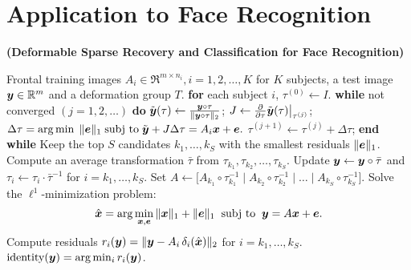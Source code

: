 \documentclass[10pt,twocolumn,letterpaper]{article}
\begin{document}
\section{Application to Face Recognition}
\begin{algorithm}[thb]
\caption{\bf (Deformable Sparse Recovery and Classification for
Face Recognition)} \label{alg:deformable-src}
\begin{algorithmic}[1]
 Frontal training images $A_i \in \Re^{m\times n_i}, i=1,2,\ldots,K$ for $K$ subjects,  a test image
${\boldsymbol{y}}\in\mathbb R^m$ and a deformation group $T$. 
\STATE
{\bf for} each subject $i$, 
\STATE \hspace{3mm} $\tau^{(0)}
\leftarrow I$. 
\STATE \hspace{3mm} {\bf while} not converged $(j=1,2,\ldots)$ {\bf do} 
\STATE \hspace{6mm}
$\tilde {{\boldsymbol{y}}}(\tau) \leftarrow \frac{{\boldsymbol{y}} \circ \tau}{\|{\boldsymbol{y}} \circ
\tau\|_2}$; \;\;\; $J \leftarrow  \frac{\partial}{\partial
\tau} \tilde{{\boldsymbol{y}}}(\tau)  \bigr|_{\tau^{(j)}} $;
\STATE \hspace{6mm} $ \Delta \tau =  \arg\min \; \| \boldsymbol{e} \|_1  \;
\textup{subj to} \; \tilde {{\boldsymbol{y}}} + J \Delta \tau = A_i {\boldsymbol{x}} + \boldsymbol{e}.$ 
\STATE
\hspace{6mm} $\tau^{(j+1)} \leftarrow \tau^{(j)} + \Delta
\tau$; 
\STATE \hspace{3mm} {\bf end while}  \STATE Keep
the top $S$ candidates $k_1, \ldots, k_S$ with the smallest
residuals $\|\boldsymbol{e}\|_1$. \STATE Compute an average transformation
$\bar{\tau}$ from $\tau_{k_1}, \tau_{k_2}, \ldots, \tau_{k_S}$.
\STATE Update ${\boldsymbol{y}} \leftarrow {\boldsymbol{y}} \circ \bar{\tau}$ and $\tau_i
\leftarrow \tau_i \cdot \bar{\tau}^{-1}$ for $i = k_1, \dots,
k_S$. \STATE Set $A \leftarrow \big[ A_{k_1} \circ
\tau_{k_1}^{-1} \mid A_{k_2} \circ \tau_{k_2}^{-1} \mid \dots
\mid A_{k_S} \circ \tau_{k_S}^{-1} \big]$. \STATE Solve the
$\ell^1$-minimization problem:
$$\hat{{\boldsymbol{x}}} = \arg \min_{{\boldsymbol{x}}, \boldsymbol{e}} \| {\boldsymbol{x}} \|_1 + \|\boldsymbol{e}\|_1 \;\; \textup{subj to} \;\; {\boldsymbol{y}} = A {\boldsymbol{x}} + \boldsymbol{e}.$$
\STATE Compute residuals $r_i({\boldsymbol{y}}) = \| {{\boldsymbol{y}}} - {A}_i \, \delta_i(\hat{{\boldsymbol{x}}}) \|_2$ for $i = k_1, \dots, k_S$.
 $\mbox{identity}({\boldsymbol{y}}) = \arg\min_i r_i({\boldsymbol{y}})$.
\end{algorithmic}
\end{algorithm}
\end{document}
